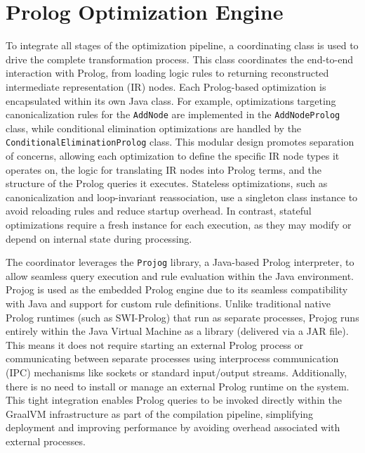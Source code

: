 \section{Prolog Optimization Engine}

To integrate all stages of the optimization pipeline, a coordinating class is used to drive the complete transformation process. This class coordinates the end-to-end interaction with Prolog, from loading logic rules to returning reconstructed intermediate representation (IR) nodes. Each Prolog-based optimization is encapsulated within its own Java class. For example, optimizations targeting canonicalization rules for the \texttt{AddNode} are implemented in the \texttt{AddNodeProlog} class, while conditional elimination optimizations are handled by the \texttt{ConditionalEliminationProlog} class. This modular design promotes separation of concerns, allowing each optimization to define the specific IR node types it operates on, the logic for translating IR nodes into Prolog terms, and the structure of the Prolog queries it executes.
Stateless optimizations, such as canonicalization and loop-invariant reassociation, use a singleton class instance to avoid reloading rules and reduce startup overhead. In contrast, stateful optimizations require a fresh instance for each execution, as they may modify or depend on internal state during processing.

The coordinator leverages the \texttt{Projog} library, a Java-based Prolog interpreter, to allow seamless query execution and rule evaluation within the Java environment.
Projog is used as the embedded Prolog engine due to its seamless compatibility with Java and support for custom rule definitions. Unlike traditional native Prolog runtimes (such as SWI-Prolog) that run as separate processes, Projog runs entirely within the Java Virtual Machine as a library (delivered via a JAR file). This means it does not require starting an external Prolog process or communicating between separate processes using interprocess communication (IPC) mechanisms like sockets or standard input/output streams. Additionally, there is no need to install or manage an external Prolog runtime on the system. This tight integration enables Prolog queries to be invoked directly within the GraalVM infrastructure as part of the compilation pipeline, simplifying deployment and improving performance by avoiding overhead associated with external processes.

